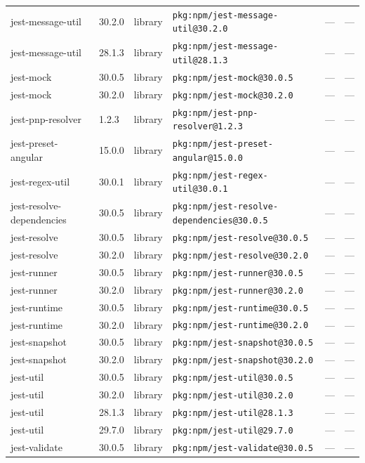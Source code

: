 \documentclass[11pt]{article}
\begin{document}
\begin{longtable}{|l|l|l|p{2.2cm}|l|p{4cm}|}
jest-message-util & 30.2.0 & library & \texttt{pkg:npm/jest-message-util@30.2.0} & — & — \\
jest-message-util & 28.1.3 & library & \texttt{pkg:npm/jest-message-util@28.1.3} & — & — \\
jest-mock & 30.0.5 & library & \texttt{pkg:npm/jest-mock@30.0.5} & — & — \\
jest-mock & 30.2.0 & library & \texttt{pkg:npm/jest-mock@30.2.0} & — & — \\
jest-pnp-resolver & 1.2.3 & library & \texttt{pkg:npm/jest-pnp-resolver@1.2.3} & — & — \\
jest-preset-angular & 15.0.0 & library & \texttt{pkg:npm/jest-preset-angular@15.0.0} & — & — \\
jest-regex-util & 30.0.1 & library & \texttt{pkg:npm/jest-regex-util@30.0.1} & — & — \\
jest-resolve-dependencies & 30.0.5 & library & \texttt{pkg:npm/jest-resolve-dependencies@30.0.5} & — & — \\
jest-resolve & 30.0.5 & library & \texttt{pkg:npm/jest-resolve@30.0.5} & — & — \\
jest-resolve & 30.2.0 & library & \texttt{pkg:npm/jest-resolve@30.2.0} & — & — \\
jest-runner & 30.0.5 & library & \texttt{pkg:npm/jest-runner@30.0.5} & — & — \\
jest-runner & 30.2.0 & library & \texttt{pkg:npm/jest-runner@30.2.0} & — & — \\
jest-runtime & 30.0.5 & library & \texttt{pkg:npm/jest-runtime@30.0.5} & — & — \\
jest-runtime & 30.2.0 & library & \texttt{pkg:npm/jest-runtime@30.2.0} & — & — \\
jest-snapshot & 30.0.5 & library & \texttt{pkg:npm/jest-snapshot@30.0.5} & — & — \\
jest-snapshot & 30.2.0 & library & \texttt{pkg:npm/jest-snapshot@30.2.0} & — & — \\
jest-util & 30.0.5 & library & \texttt{pkg:npm/jest-util@30.0.5} & — & — \\
jest-util & 30.2.0 & library & \texttt{pkg:npm/jest-util@30.2.0} & — & — \\
jest-util & 28.1.3 & library & \texttt{pkg:npm/jest-util@28.1.3} & — & — \\
jest-util & 29.7.0 & library & \texttt{pkg:npm/jest-util@29.7.0} & — & — \\
jest-validate & 30.0.5 & library & \texttt{pkg:npm/jest-validate@30.0.5} & — & — \\

\end{longtable}
\end{document}

